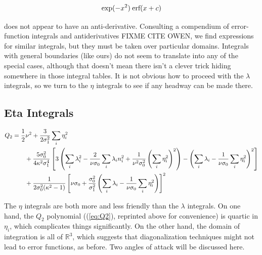 \documentclass[10pt,letterpaper]{article}
\def\half{{1 \over 2}}
\begin{document}
\begin{equation} \label{eq:nonointegral}
\exp(-x^2)  \hspace{0.2pc} \text{erf}(x+c)
\end{equation}

does not appear to have an anti-derivative. Consulting a compendium of error-function integrals and antiderivatives FIXME CITE OWEN, we find expressions for similar integrals, but they must be taken over particular domains. Integrals with general boundaries (like ours) do not seem to translate into any of the special cases, although that doesn't mean there isn't a clever trick hiding somewhere in those integral tables.
It is not obvious how to proceed with the $\lambda$ integrals, so we turn to the $\eta$ integrals to see if any headway can be made there.

\subsection{Eta Integrals}

\vspace{1pc}
\begin{equation*}
\begin{split}
Q_2 &= \half \nu^2 + {3 \over 2 \sigma_1^2} \sum_{i} \eta_{i}^2 \nonumber \\
     &\qquad + {5 \sigma_0^2 \over 4 \kappa^2 \sigma_1^4} \left[3
     \left( \sum_i \lambda_i^2 - {2 \over \nu \sigma_0} \sum_i
     \lambda_i  n_i^2 + {1 \over \nu^2 \sigma_0^2} \left(
     \sum_i \eta_i^2 \right)^2\right) - \left(\sum_i
     \lambda_i - {1 \over \nu \sigma_0} \sum_i \eta_i^2
     \right)^2\right] \nonumber \\ 
     &\qquad + {1 \over 2 \sigma_0^2 (\kappa^2 - 1)}
     \left[\nu \sigma_0 + {\sigma_0^2 \over \sigma_1^2}
     \left(\sum_i \lambda_i - {1 \over \nu \sigma_0} \sum_i
     \eta_i^2 \right)\right]^2 \\
\end{split}
\end{equation*}
\vspace{1pc}


The $\eta$ integrals are both more and less friendly than the $\lambda$ integrals. On one hand, the $Q_2$ polynomial ((\ref{eq:Q2}), reprinted above for convenience) is quartic in $\eta_i$, which complicates things significantly. On the other hand, the domain of integration is all of $\mathbb{R}^3$, which suggests that diagonalization techniques might not lead to error functions, as before. Two angles of attack will be discussed here.
\end{document}
